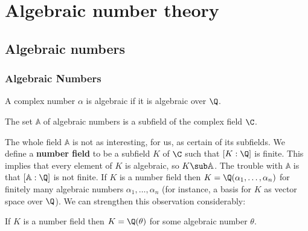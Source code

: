 \chapter{Algebraic number theory}
\section{Algebraic numbers}
\subsection{Algebraic Numbers}
\begin{definition}
A complex number $\alpha$ is algebraic if it is algebraic over $\Q$.
\end{definition}
\begin{theorem}
The set $\mathbb{A}$ of algebraic numbers is a subfield of the complex field $\C$.
\end{theorem}
The whole field $\mathbb{A}$ is not as interesting, for us, as certain of its subfields. We define a \textbf{number field} to be a subfield $K$ of $\C$ such that $[K:\Q]$ is finite. This implies that every element of $K$ is algebraic, so $K\sub\mathbb{A}$. The trouble with $\mathbb{A}$ is that $[\mathbb{A}:\Q]$ is not finite. If $K$ is a number field then $K=\Q(\alpha_1,\dots,\alpha_n)$ for finitely many algebraic numbers $\alpha_1,\dots,\alpha_n$ (for instance, a basis for $K$ as vector space over $\Q$). We can strengthen this observation
considerably:
\begin{theorem}\label{number field simple}
If $K$ is a number field then $K=\Q(\theta)$ for some algebraic number $\theta$.
\end{theorem}
